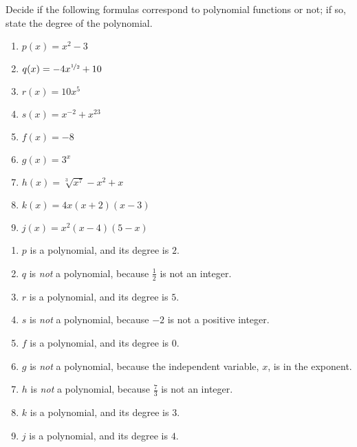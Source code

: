 \begin{pccexample}
	Decide if the following formulas correspond to polynomial functions 
	or not; if so, state the degree of the polynomial.
	\begin{multicols}{3}
		\begin{enumerate}
			\item $p(x)=x^2-3$     
			\item $q(x)=-4x^{\nicefrac{1}{2}}+10$     
			\item $r(x)=10x^5$
			\item $s(x)=x^{-2}+x^{23}$
			\item $f(x)=-8$
			\item $g(x)=3^x$
			\item $h(x)=\sqrt[3]{x^7}-x^2+x$
			\item $k(x)=4x(x+2)(x-3)$
			\item $j(x)=x^2(x-4)(5-x)$
		\end{enumerate}
	\end{multicols}
	\begin{pccsolution}
		\begin{enumerate}
			\item $p$ is a polynomial, and its degree is $2$.
			\item $q$ is \emph{not} a polynomial, because $\frac{1}{2}$ is not an integer.
			\item $r$ is a polynomial, and its degree is $5$.
			\item $s$ is \emph{not} a polynomial, because $-2$ is not a positive integer.
			\item $f$ is a polynomial, and its degree is $0$.
			\item $g$ is \emph{not} a polynomial, because the independent 
			variable, $x$, is in the exponent.
			\item $h$ is \emph{not} a polynomial, because $\frac{7}{3}$ is not an integer.
			\item $k$ is a polynomial, and its degree is $3$.
			\item $j$ is a polynomial, and its degree is $4$.
		\end{enumerate}
	\end{pccsolution}
\end{pccexample}

